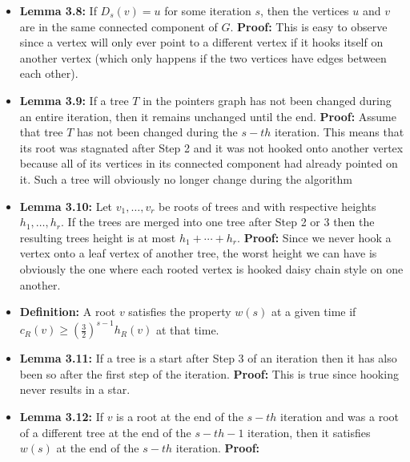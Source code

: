 \documentclass[a4paper]{article}
\begin{document}
\begin{itemize}
\begin{itemize}
\item \textbf{Lemma 3.8:} If $D_s(v) = u$ for some iteration $s$, then the vertices $u$ and $v$ are in the same connected component of $G$. \textbf{Proof:} This is easy to observe since a vertex will only ever point to a different vertex if it hooks itself on another vertex (which only happens if the two vertices have edges between each other). 

\item \textbf{Lemma 3.9:} If a tree $T$ in the pointers graph has not been changed during an entire iteration, then it remains unchanged until the end. \textbf{Proof:} Assume that tree $T$ has not been changed during the $s-th$ iteration. This means that its root was stagnated after Step 2 and it was not hooked onto another vertex because all of its vertices in its connected component had already pointed on it. Such a tree will obviously no longer change during the algorithm

\item \textbf{Lemma 3.10:} Let $v_1,\ldots, v_r$ be roots of trees and with respective heights $h_1,\ldots, h_r$. If the trees are merged into one tree after Step 2 or 3 then the resulting trees height is at most $h_1 + \cdots + h_r$. \textbf{Proof:} Since we never hook a vertex onto a leaf vertex of another tree, the worst height we can have is obviously the one where each rooted vertex is hooked daisy chain style on one another.

\item \textbf{Definition:} A root $v$ satisfies the property $w(s)$ at a given time if $c_R(v) \geq (\frac{3}{2})^{s-1}h_R(v)$ at that time.

\item \textbf{Lemma 3.11:} If a tree is a start after Step 3 of an iteration then it has also been so after the first step of the iteration. \textbf{Proof:} This is true since hooking never results in a star.

\item \textbf{Lemma 3.12:} If $v$ is a root at the end of the $s-th$ iteration and was a root  of a different tree at the end of the $s-th - 1$ iteration, then it satisfies $w(s)$ at the end of the $s-th$ iteration. \textbf{Proof:} 

\end{itemize}

\end{itemize}
\end{document}

